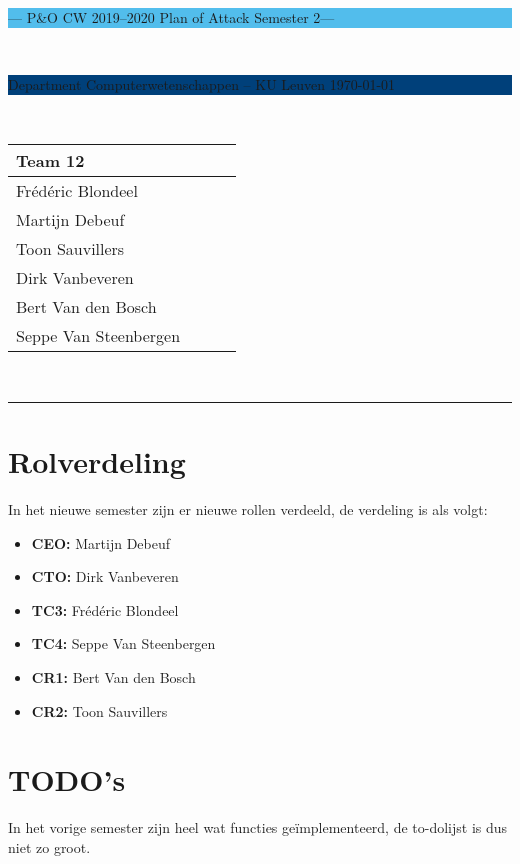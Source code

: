 \documentclass[a4paper,11pt]{article}
\begin{document}
\noindent
\colorbox[HTML]{52BDEC}{\bfseries\parbox{\textwidth}{\centering\large
  --- P\&O CW 2019--2020 Plan of Attack Semester 2---
}}
\\[-1mm]
\colorbox[HTML]{00407A}{\bfseries\color{white}\parbox{\textwidth}{
  Department Computerwetenschappen -- KU Leuven
  \hfill
  \today
}}
\\

\smallskip

\noindent

\begin{tabular}{*4l}
\toprule
\multicolumn{2}{l}{\large\textbf{Team 12}} \\
\midrule
Frédéric Blondeel &  \\
Martijn Debeuf &  \\
Toon Sauvillers &  \\ %
Dirk Vanbeveren &  \\
Bert Van den Bosch &  \\ 
Seppe Van Steenbergen &  \\

\bottomrule
\hline
\end{tabular}\\
\noindent


{\color[HTML]{52BDEC} \rule{\linewidth}{1mm} }

\section{Rolverdeling}
In het nieuwe semester zijn er nieuwe rollen verdeeld, de verdeling is als volgt:
\begin{multicols}{2}
\begin{itemize}
	\item {\bf CEO:} Martijn Debeuf
	\item {\bf CTO:} Dirk Vanbeveren
	\item {\bf TC3:} Frédéric Blondeel
	\item {\bf TC4:} Seppe Van Steenbergen
	\item {\bf CR1:} Bert Van den Bosch
	\item {\bf CR2:} Toon Sauvillers
\end{itemize}
\end{multicols}
\section{TODO's}
In het vorige semester zijn heel wat functies geïmplementeerd, de to-dolijst is dus niet zo groot.
\end{document}
